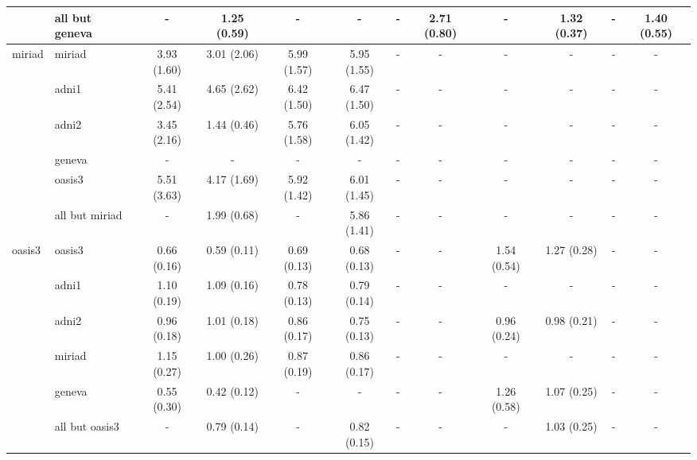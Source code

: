 \begin{table*}
{\begin{tabular}{llcccccccccc}
\cmidrule(lr){2-12}
       & all but geneva &            - &  1.25 (0.59) &            - &            - &            - &  2.71 (0.80) &            - &  1.32 (0.37) &            - &  1.40 (0.55) \\
\midrule
miriad & miriad &  3.93 (1.60) &  3.01 (2.06) &  5.99 (1.57) &  5.95 (1.55) &            - &            - &            - &            - &            - &            - \\
\cmidrule(lr){2-12}
       & adni1 &  5.41 (2.54) &  4.65 (2.62) &  6.42 (1.50) &  6.47 (1.50) &            - &            - &            - &            - &            - &            - \\
       & adni2 &  3.45 (2.16) &  1.44 (0.46) &  5.76 (1.58) &  6.05 (1.42) &            - &            - &            - &            - &            - &            - \\
       & geneva &            - &            - &            - &            - &            - &            - &            - &            - &            - &            - \\
       & oasis3 &  5.51 (3.63) &  4.17 (1.69) &  5.92 (1.42) &  6.01 (1.45) &            - &            - &            - &            - &            - &            - \\
\cmidrule(lr){2-12}
       & all but miriad &            - &  1.99 (0.68) &            - &  5.86 (1.41) &            - &            - &            - &            - &            - &            - \\
\midrule
oasis3 & oasis3 &  0.66 (0.16) &  0.59 (0.11) &  0.69 (0.13) &  0.68 (0.13) &            - &            - &  1.54 (0.54) &  1.27 (0.28) &            - &            - \\
\cmidrule(lr){2-12}
       & adni1 &  1.10 (0.19) &  1.09 (0.16) &  0.78 (0.13) &  0.79 (0.14) &            - &            - &            - &            - &            - &            - \\
       & adni2 &  0.96 (0.18) &  1.01 (0.18) &  0.86 (0.17) &  0.75 (0.13) &            - &            - &  0.96 (0.24) &  0.98 (0.21) &            - &            - \\
       & miriad &  1.15 (0.27) &  1.00 (0.26) &  0.87 (0.19) &  0.86 (0.17) &            - &            - &            - &            - &            - &            - \\
       & geneva &  0.55 (0.30) &  0.42 (0.12) &            - &            - &            - &            - &  1.26 (0.58) &  1.07 (0.25) &            - &            - \\
\cmidrule(lr){2-12}
       & all but oasis3 &            - &  0.79 (0.14) &            - &  0.82 (0.15) &            - &            - &            - &  1.03 (0.25) &            - &            - \\
\midrule
\bottomrule
\end{tabular}}
\end{table*}

